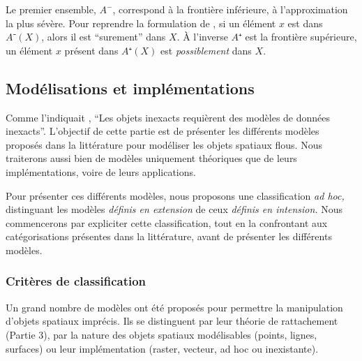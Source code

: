 Le premier ensemble, $A^-$, correspond à la frontière inférieure, à
l'approximation la plus sévère. Pour reprendre la formulation de
\textcite{Pawlak1982}, si un élément $x$ est dans $A⁻(X)$, alors il
est \enquote{surement} dans $X$. À l'inverse $A⁺$ est la frontière
supérieure, un élément $x$ présent dans $A⁺(X)$ est
\emph{possiblement} dans $X$.


\subsection{Modélisations et implémentations}


Comme l’indiquait \textcite[p. 15]{Burrough1996}, \enquote{Les objets
  inexacts requièrent des modèles de données inexacts}. L’objectif de
cette partie est de présenter les différents modèles proposés dans la
littérature pour modéliser les objets spatiaux flous. Nous traiterons
aussi bien de modèles uniquement théoriques que de leurs
implémentations, voire de leurs applications.

Pour présenter ces différents modèles, nous proposons une
classification \emph{ad hoc,} distinguant les modèles \emph{définis en
  extension} de ceux \emph{définis en intension.} Nous commencerons
par expliciter cette classification, tout en la confrontant aux
catégorisations présentes dans la littérature, avant de présenter les
différents modèles.

\subsubsection{Critères de classification}

Un grand nombre de modèles ont été proposés pour permettre la
manipulation d’objets spatiaux imprécis. Ils se distinguent par leur
théorie de rattachement (Partie 3), par la nature des objets spatiaux
modélisables (\eg points, lignes, surfaces) ou leur implémentation
(\eg raster, vecteur, ad hoc ou inexistante).

